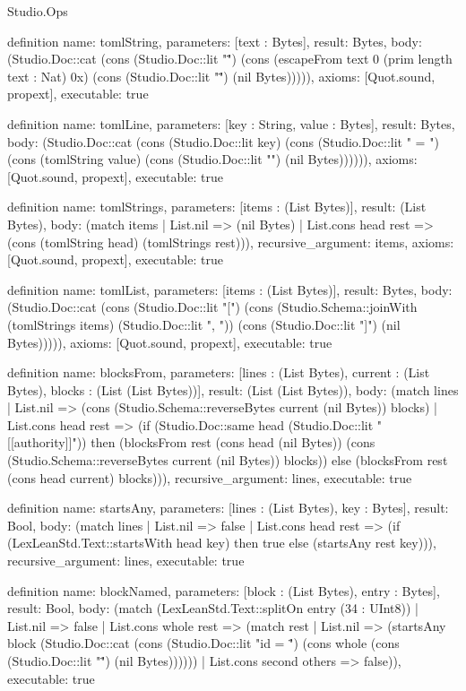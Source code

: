 \begin{lexlean}{Studio.Ops}
\begin{semanticmodule}
definition{
  name: tomlString,
  parameters: [text : Bytes],
  result: Bytes,
  body: (Studio.Doc::cat (cons (Studio.Doc::lit "\"") (cons (escapeFrom text 0 (prim length text : Nat) 0x) (cons (Studio.Doc::lit "\"") (nil Bytes))))),
  axioms: [Quot.sound, propext],
  executable: true
}


definition{
  name: tomlLine,
  parameters: [key : String, value : Bytes],
  result: Bytes,
  body: (Studio.Doc::cat (cons (Studio.Doc::lit key) (cons (Studio.Doc::lit " = ") (cons (tomlString value) (cons (Studio.Doc::lit "\n") (nil Bytes)))))),
  axioms: [Quot.sound, propext],
  executable: true
}


definition{
  name: tomlStrings,
  parameters: [items : (List Bytes)],
  result: (List Bytes),
  body: (match items
    | List.nil => (nil Bytes)
    | List.cons head rest => (cons (tomlString head) (tomlStrings rest))),
  recursive_argument: items,
  axioms: [Quot.sound, propext],
  executable: true
}


definition{
  name: tomlList,
  parameters: [items : (List Bytes)],
  result: Bytes,
  body: (Studio.Doc::cat (cons (Studio.Doc::lit "[") (cons (Studio.Schema::joinWith (tomlStrings items) (Studio.Doc::lit ", ")) (cons (Studio.Doc::lit "]") (nil Bytes))))),
  axioms: [Quot.sound, propext],
  executable: true
}


definition{
  name: blocksFrom,
  parameters: [lines : (List Bytes), current : (List Bytes), blocks : (List (List Bytes))],
  result: (List (List Bytes)),
  body: (match lines
    | List.nil => (cons (Studio.Schema::reverseBytes current (nil Bytes)) blocks)
    | List.cons head rest => (if (Studio.Doc::same head (Studio.Doc::lit "[[authority]]")) then (blocksFrom rest (cons head (nil Bytes)) (cons (Studio.Schema::reverseBytes current (nil Bytes)) blocks)) else (blocksFrom rest (cons head current) blocks))),
  recursive_argument: lines,
  executable: true
}


definition{
  name: startsAny,
  parameters: [lines : (List Bytes), key : Bytes],
  result: Bool,
  body: (match lines
    | List.nil => false
    | List.cons head rest => (if (LexLeanStd.Text::startsWith head key) then true else (startsAny rest key))),
  recursive_argument: lines,
  executable: true
}

definition{
  name: blockNamed,
  parameters: [block : (List Bytes), entry : Bytes],
  result: Bool,
  body: (match (LexLeanStd.Text::splitOn entry (34 : UInt8))
    | List.nil => false
    | List.cons whole rest => (match rest
      | List.nil => (startsAny block (Studio.Doc::cat (cons (Studio.Doc::lit "id = \"") (cons whole (cons (Studio.Doc::lit "\"") (nil Bytes))))))
      | List.cons second others => false)),
  executable: true
}



\end{semanticmodule}
\end{lexlean}
